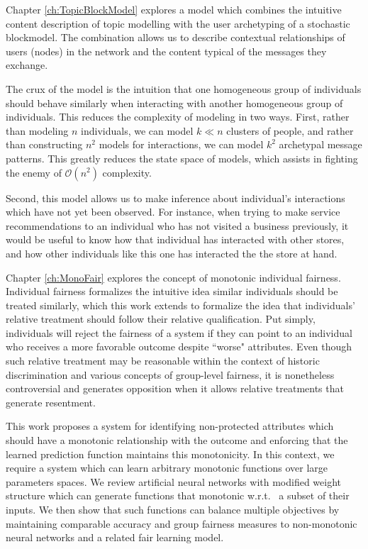 Chapter \ref{ch:TopicBlockModel} explores a model which combines the intuitive content description of topic modelling with the user archetyping of a stochastic blockmodel.  The combination allows us to describe contextual relationships of users (nodes) in the network and the content typical of the messages they exchange.

The crux of the model is the intuition that one homogeneous group of individuals should behave similarly when interacting with another homogeneous group of individuals.  This reduces the complexity of modeling in two ways.  First, rather than modeling $n$ individuals, we can model $k \ll n$ clusters of people, and rather than constructing $n^2$ models for interactions, we can model $k^2$ archetypal message patterns.  This greatly reduces the state space of models, which assists in fighting the enemy of $\mathcal{O}(n^2)$ complexity.  

Second, this model allows us to make inference about individual's interactions which have not yet been observed.  For instance, when trying to make service recommendations to an individual who has not visited a business previously, it would be useful to know how that individual has interacted with other stores, and how other individuals like this one has interacted the the store at hand.



Chapter \ref{ch:MonoFair} explores the concept of monotonic individual fairness.  Individual fairness \citep{dwork2012fairness} formalizes the intuitive idea similar individuals should be treated similarly, which this work extends to formalize the idea that individuals' relative treatment should follow their relative qualification.  Put simply, individuals will reject the fairness of a system if they can point to an individual who receives a more favorable outcome despite ``worse" attributes.  Even though such relative treatment may be reasonable within the context of historic discrimination and various concepts of group-level fairness, it is nonetheless controversial and generates opposition when it allows relative treatments that generate resentment.

This work proposes a system for identifying non-protected attributes which should have a monotonic relationship with the outcome and enforcing that the learned prediction function maintains this monotonicity.  In this context, we require a system which can learn arbitrary monotonic functions over large parameters spaces.  We review artificial neural networks with modified weight structure which can generate functions that monotonic w.r.t.~ a subset of their inputs. We then show that such functions can balance multiple objectives by maintaining comparable accuracy and group fairness measures to non-monotonic neural networks and a related fair learning model.



